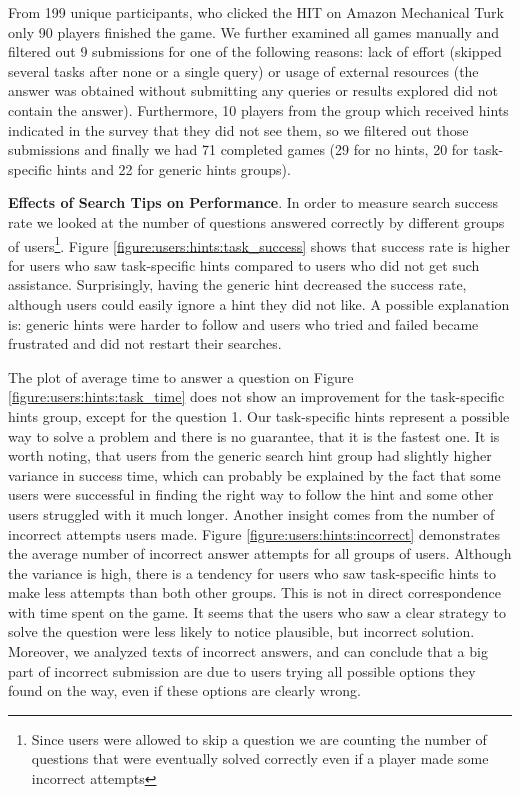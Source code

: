 From 199 unique participants, who clicked the HIT on Amazon Mechanical Turk only 90 players finished the game.
We further examined all games manually and filtered out 9 submissions for one of the following reasons: lack of effort (\eg skipped several tasks after none or a single query) or usage of external resources (\eg the answer was obtained without submitting any queries or results explored did not contain the answer).
Furthermore, 10 players from the group which received hints indicated in the survey that they did not see them, so we filtered out those submissions and finally we had 71 completed games (29 for no hints, 20 for task-specific hints and 22 for generic hints groups).

\textbf{Effects of Search Tips on Performance}.
In order to measure search success rate we looked at the number of questions answered correctly by different groups of users\footnote{Since users were allowed to skip a question we are counting the number of questions that were eventually solved correctly even if a player made some incorrect attempts}.
Figure \ref{figure:users:hints:task_success} shows that success rate is higher for users who saw task-specific hints compared to users who did not get such assistance.
Surprisingly, having the generic hint decreased the success rate, although users could easily ignore a hint they did not like.
A possible explanation is: generic hints were harder to follow and users who tried and failed became frustrated and did not restart their searches.

The plot of average time to answer a question on Figure \ref{figure:users:hints:task_time} does not show an improvement for the task-specific hints group, except for the question 1.
Our task-specific hints represent a possible way to solve a problem and there is no guarantee, that it is the fastest one.
It is worth noting, that users from the generic search hint group had slightly higher variance in success time, which can probably be explained by the fact that some users were successful in finding the right way to follow the hint and some other users struggled with it much longer.
Another insight comes from the number of incorrect attempts users made.
Figure \ref{figure:users:hints:incorrect} demonstrates the average number of incorrect answer attempts for all groups of users.
Although the variance is high, there is a tendency for users who saw task-specific hints to make less attempts than both other groups.
This is not in direct correspondence with time spent on the game.
It seems that the users who saw a clear strategy to solve the question were less likely to notice plausible, but incorrect solution.
Moreover, we analyzed texts of incorrect answers, and can conclude that a big part of incorrect submission are due to users trying all possible options they found on the way, even if these options are clearly wrong.


